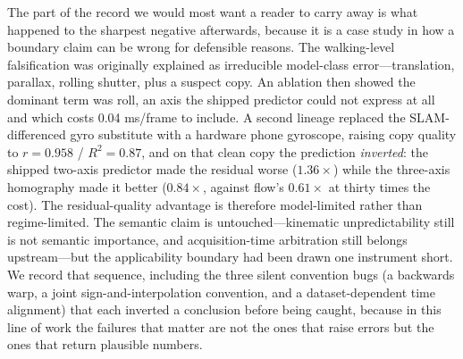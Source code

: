 \documentclass[12pt,a4paper]{article}
\begin{document}
The part of the record we would most want a reader to carry away is what happened to the sharpest negative afterwards, because it is a case study in how a boundary claim can be wrong for defensible reasons. The walking-level falsification was originally explained as irreducible model-class error---translation, parallax, rolling shutter, plus a suspect copy. An ablation then showed the dominant term was roll, an axis the shipped predictor could not express at all and which costs 0.04 ms/frame to include. A second lineage replaced the SLAM-differenced gyro substitute with a hardware phone gyroscope, raising copy quality to $r{=}0.958$ / $R^2{=}0.87$, and on that clean copy the prediction \emph{inverted}: the shipped two-axis predictor made the residual worse ($1.36\times$) while the three-axis homography made it better ($0.84\times$, against flow's $0.61\times$ at thirty times the cost). The residual-quality advantage is therefore model-limited rather than regime-limited. The semantic claim is untouched---kinematic unpredictability still is not semantic importance, and acquisition-time arbitration still belongs upstream---but the applicability boundary had been drawn one instrument short. We record that sequence, including the three silent convention bugs (a backwards warp, a joint sign-and-interpolation convention, and a dataset-dependent time alignment) that each inverted a conclusion before being caught, because in this line of work the failures that matter are not the ones that raise errors but the ones that return plausible numbers.
\end{document}
